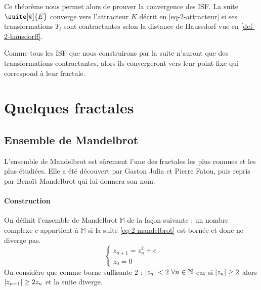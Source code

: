 		Ce théorème nous permet alors de prouver la convergence des ISF.
		La suite $\suite[k]{E}$ converge vers l'attracteur $K$ décrit en \eqref{eq-2-attracteur} si ses transformations $T_i$ sont contractantes selon la distance de Haussdorf vue en \ref{def-2-hausdorff}.

		Comme tous les ISF que nous construirons par la suite n'auront que des transformations contractantes, alors ils convergeront vers leur point fixe qui correspond à leur fractale.




\section{Quelques fractales}

	\subsection{Ensemble de Mandelbrot}

		
	

			L'ensemble de Mandelbrot est sûrement l'une des fractales les plus connues et les plus étudiées. Elle a été découvert par Gaston Julia et Pierre Fatou, puis repris par Benoît Mandelbrot qui lui donnera son nom. 

		\paragraph{Construction}

			On définit l'ensemble de Mandelbrot $\mathbb{M}$ de la façon suivante :
			un nombre complexe $c$ appartient à $\mathbb{M}$ si la suite \eqref{eq-2-mandelbrot} est bornée et donc ne diverge pas.
			\begin{equation}
				\label{eq-2-mandelbrot}
				\begin{cases}
					z_{n+1} = z_n^2 + c		\\
					z_0 = 0
				\end{cases}
			\end{equation}
			On considère que comme borne suffisante 2 : $\lvert z_n \rvert < 2 ~\forall n\in\mathbb{N}$ car si $\lvert z_n \rvert\geq 2$ alors $\lvert z_{n+1} \rvert\geq 2z_n$ et la suite diverge. 

